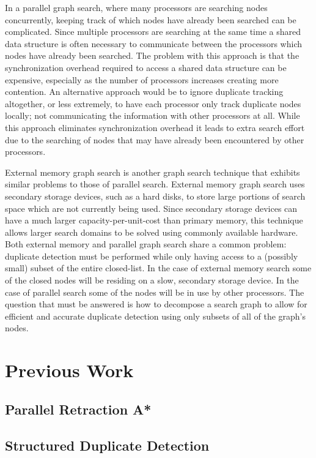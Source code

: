 \documentclass{article}
\begin{document}
In a parallel graph search, where many processors are searching nodes
concurrently, keeping track of which nodes have already been searched
can be complicated.  Since multiple processors are searching at the
same time a shared data structure is often necessary to communicate
between the processors which nodes have already been searched.  The
problem with this approach is that the synchronization overhead
required to access a shared data structure can be expensive,
especially as the number of processors increases creating more
contention.  An alternative approach would be to ignore duplicate
tracking altogether, or less extremely, to have each processor only
track duplicate nodes locally; not communicating the information with
other processors at all.  While this approach eliminates
synchronization overhead it leads to extra search effort due to the
searching of nodes that may have already been encountered by other
processors.

External memory graph search is another graph search technique that
exhibits similar problems to those of parallel search.  External
memory graph search uses secondary storage devices, such as a hard
disks, to store large portions of search space which are not currently
being used.  Since secondary storage devices can have a much larger
capacity-per-unit-cost than primary memory, this technique allows
larger search domains to be solved using commonly available hardware.
Both external memory and parallel graph search share a common problem:
duplicate detection must be performed while only having access to a
(possibly small) subset of the entire closed-list.  In the case of
external memory search some of the closed nodes will be residing on a
slow, secondary storage device.  In the case of parallel search some
of the nodes will be in use by other processors.  The question that
must be answered is how to decompose a search graph to allow for
efficient and accurate duplicate detection using only subsets of all
of the graph's nodes.

\section{Previous Work}

\subsection{Parallel Retraction A*}

\subsection{Structured Duplicate Detection}
\end{document}
